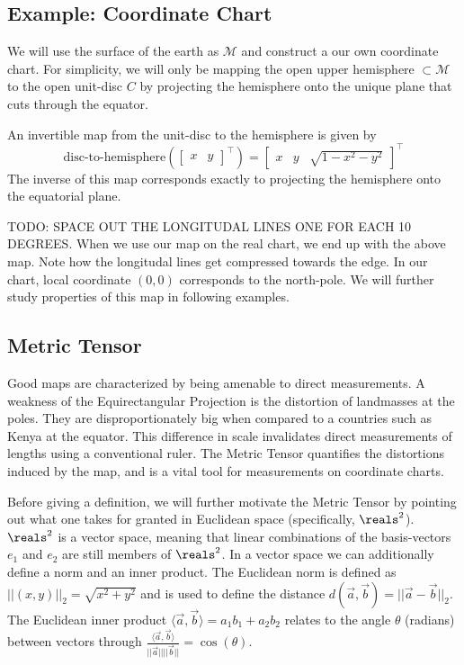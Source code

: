\subsection{ Example: Coordinate Chart}
We will use the surface of the earth as $\mathcal{M}$ and construct a our own coordinate chart. For simplicity, we will only be mapping the open upper hemisphere $\subset \mathcal{M}$ to the open unit-disc $C$ by projecting the hemisphere onto the unique plane that cuts through the equator. 

An invertible map from the unit-disc to the hemisphere is given by $$\text{disc-to-hemisphere}(\begin{bmatrix}x & y\end{bmatrix}^\top) = \begin{bmatrix}x & y & \sqrt{1 - x^2 - y^2}\end{bmatrix}^\top $$ The inverse of this map corresponds exactly to projecting the hemisphere onto the equatorial plane.

TODO: SPACE OUT THE LONGITUDAL LINES ONE FOR EACH 10 DEGREES.
When we use our map on the real chart, we end up with the above map. Note how the longitudal lines get compressed towards the edge. In our chart, local coordinate $(0, 0)$ corresponds to the north-pole. We will further study properties of this map in following examples.




\subsection{ Metric Tensor}

Good maps are characterized by being amenable to direct measurements. A weakness of the Equirectangular Projection is the distortion of landmasses at the poles. They are disproportionately big when compared to a countries such as Kenya at the equator. This difference in scale invalidates direct measurements of lengths using a conventional ruler. The Metric Tensor quantifies the distortions induced by the map, and is a vital tool for measurements on coordinate charts.

Before giving a definition, we will further motivate the Metric Tensor by pointing out what one takes for granted in Euclidean space (specifically, $\reals^2$). $\reals^2$ is a vector space, meaning that linear combinations of the basis-vectors $e_1$ and $e_2$ are still members of $\reals^2$. In a vector space we can additionally define a norm and an inner product. The Euclidean norm is defined as $||(x,y)||_2 = \sqrt{x^2 + y^2}$ and is used to define the distance $d(\vec{a}, \vec{b}) = ||\vec{a}-\vec{b}||_2$. The Euclidean inner product $\langle \vec{a},\vec{b} \rangle = a_1b_1 +a_2b_2$ relates to the angle $\theta$ (radians) between vectors through $\frac{\langle \vec{a},\vec{b} \rangle}{||\vec{a}||||\vec{b}||} = \cos(\theta)$.


